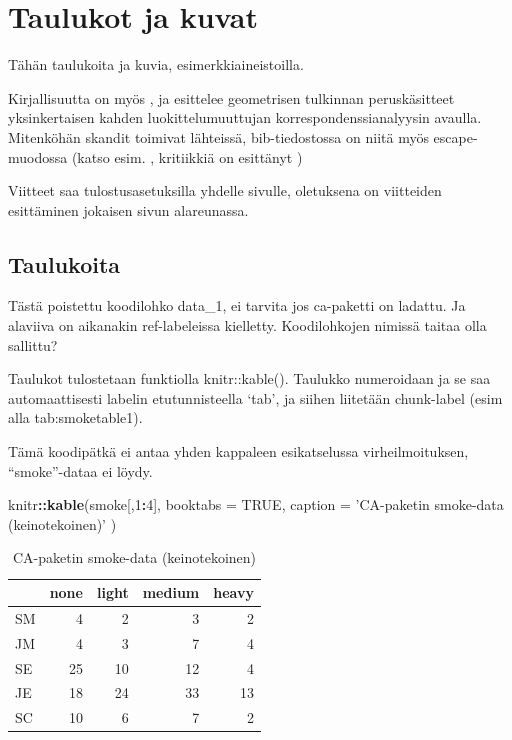 \documentclass[
  finnish,
]{book}
\newenvironment{Shaded}{\begin{snugshade}}{\end{snugshade}}
\newcommand{\DataTypeTok}[1]{\textcolor[rgb]{0.13,0.29,0.53}{#1}}
\newcommand{\DecValTok}[1]{\textcolor[rgb]{0.00,0.00,0.81}{#1}}
\newcommand{\KeywordTok}[1]{\textcolor[rgb]{0.13,0.29,0.53}{\textbf{#1}}}
\newcommand{\NormalTok}[1]{#1}
\newcommand{\OperatorTok}[1]{\textcolor[rgb]{0.81,0.36,0.00}{\textbf{#1}}}
\newcommand{\OtherTok}[1]{\textcolor[rgb]{0.56,0.35,0.01}{#1}}
\newcommand{\StringTok}[1]{\textcolor[rgb]{0.31,0.60,0.02}{#1}}
\begin{document}
\hypertarget{taulukot-ja-kuvat}{%
\chapter{Taulukot ja kuvat}\label{taulukot-ja-kuvat}}

Tähän taulukoita ja kuvia, esimerkkiaineistoilla.

Kirjallisuutta on myös \citep{RefWorks:68}, ja \citep{RefWorks:57} esittelee geometrisen tulkinnan peruskäsitteet yksinkertaisen kahden luokittelumuuttujan korrespondenssianalyysin avaulla. Mitenköhän skandit toimivat lähteissä, bib-tiedostossa on niitä myös escape-muodossa (katso esim. \citep{RefWorks:100}, kritiikkiä on esittänyt \citep{RefWorks:110})

Viitteet saa tulostusasetuksilla yhdelle sivulle, oletuksena on viitteiden esittäminen jokaisen sivun alareunassa.

\hypertarget{taulukoita}{%
\section{Taulukoita}\label{taulukoita}}

Tästä poistettu koodilohko data\_1, ei tarvita jos ca-paketti on ladattu. Ja alaviiva on aikanakin ref-labeleissa kielletty. Koodilohkojen nimissä taitaa olla sallittu?

Taulukot tulostetaan funktiolla knitr::kable(). Taulukko numeroidaan ja se saa automaattisesti labelin etutunnisteella `tab', ja siihen liitetään chunk-label (esim alla tab:smoketable1).

Tämä koodipätkä ei antaa yhden kappaleen esikatselussa virheilmoituksen, ``smoke''-dataa ei löydy.

\begin{Shaded}
\begin{Highlighting}[]
\NormalTok{knitr}\OperatorTok{::}\KeywordTok{kable}\NormalTok{(smoke[,}\DecValTok{1}\OperatorTok{:}\DecValTok{4}\NormalTok{], }\DataTypeTok{booktabs =} \OtherTok{TRUE}\NormalTok{,}
  \DataTypeTok{caption =} \StringTok{'CA-paketin smoke-data (keinotekoinen)'}
\NormalTok{)}
\end{Highlighting}
\end{Shaded}

\begin{table}

\caption{\label{tab:smoketable1}CA-paketin smoke-data (keinotekoinen)}
\centering
\begin{tabular}[t]{lrrrr}
\toprule
  & none & light & medium & heavy\\
\midrule
SM & 4 & 2 & 3 & 2\\
JM & 4 & 3 & 7 & 4\\
SE & 25 & 10 & 12 & 4\\
JE & 18 & 24 & 33 & 13\\
SC & 10 & 6 & 7 & 2\\
\bottomrule
\end{tabular}
\end{table}
\end{document}

